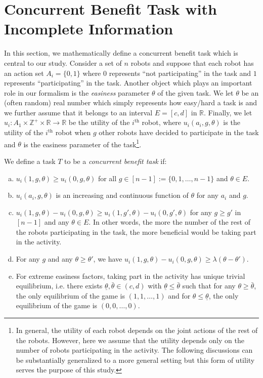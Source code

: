\documentclass[conference]{IEEEtran}
\def\Z{\mathbb{Z}}
\def\R{\mathbb{R}}
\begin{document}
\section{Concurrent Benefit Task with Incomplete Information}
In this section, we mathematically define a concurrent benefit task which is central to our study. Consider a set of $n$ robots and suppose that each robot has an action set $A_i=\{0,1\}$ where $0$ represents ``not participating'' in the task and $1$ represents ``participating'' in the task.  Another object which plays an important role in our formalism is the \textit{easiness} parameter $\theta$ of the given task. We let $\theta$ be an (often random) real number which simply represents how easy/hard a task is and we further assume that it belongs to an interval $E=[c,d]$ in $\R$.  Finally, we let $u_i:A_1\times\Z^+\times \R\to \R$ be the utility of the $i^{\text{th}}$ robot, where $u_i(a_i,g,\theta)$ is the utility of the $i^{\text{th}}$ robot when $g$ other robots have decided to participate in the task and $\theta$ is the easiness parameter of the task\footnote{In general, the utility of each robot depends on the joint actions of the rest of the robots. However, here we assume that the utility depends only on the number of robots participating in the activity. The following discussions can be substantially generalized to a more general setting but this form of utility serves the purpose of this study.}. 

We define a task $T$ to be a \textit{concurrent benefit task} if: 
\begin{enumerate}[a.]
	\item $u_i(1,g,\theta)\geq u_i(0,g,\theta)$ for all $g\in[n-1]:=\{0,1,\ldots,n-1\}$ and $\theta \in E$. 
	\item $u_i(a_i,g,\theta)$ is an increasing and continuous function of $\theta$ for any $a_i$ and $g$. 
	\item $u_i(1,g,\theta)-u_i(0,g,\theta)\geq u_i(1,g',\theta)-u_i(0,g',\theta)$ for any $g\geq g'$ in $[n-1]$ and any $\theta\in E$. In other words, the more the number of the rest of the robots participating in the task, the more beneficial would be taking part in the activity.
	\item For any $g$ and any $\theta\geq \theta'$, we have $u_i(1,g,\theta)-u_i(0,g,\theta)\geq \lambda (\theta-\theta')$. 
	\item For extreme easiness factors, taking part in the activity has unique trivial equilibrium, i.e. there exists $\underline{\theta},\bar{\theta}\in (c,d)$ with $\underline{\theta}\leq \bar{\theta}$ such that for any $\theta\geq \bar{\theta}$, the only equilibrium of the game is $(1,1,\ldots,1)$ and for $\theta\leq \underline{\theta}$, the only equilibrium of the game is $(0,0,\ldots,0)$.
\end{enumerate}
\end{document}
